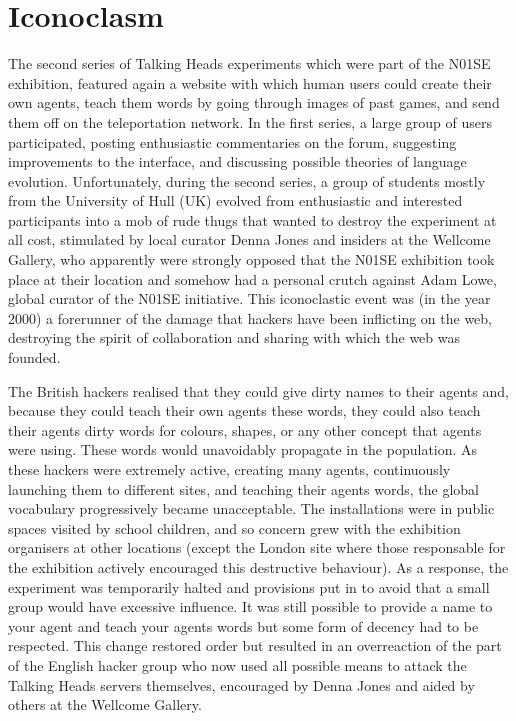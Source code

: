 \section{Iconoclasm} 

The second series of Talking Heads experiments which were part of the N01SE exhibition,
featured again a website with which human users could create their own 
agents, teach them words by going through images of past games, and send them off on the teleportation network.
In the first series, a
large group of users participated, posting enthusiastic commentaries on the forum, suggesting improvements 
to the interface, and discussing possible theories of language evolution. Unfortunately, during the second 
series, a group of students mostly from the University of Hull (UK) evolved from enthusiastic and interested 
participants into a mob of rude thugs that wanted to destroy the experiment at all cost, stimulated by 
local curator Denna Jones and insiders at the Wellcome Gallery, who apparently were strongly opposed 
that the N01SE exhibition took place 
at their location and somehow had a personal crutch against Adam Lowe, global curator of the N01SE initiative. 
This iconoclastic event was (in the year 2000) a forerunner of the damage that 
hackers have been inflicting on the web, destroying the spirit of collaboration and 
sharing with which the web was founded. 

The British hackers realised that they could give dirty names to their agents and, because they 
could teach their own agents these words, they could also teach their agents dirty words for colours, 
shapes, or any other concept that agents were using. These words would unavoidably propagate in the population. 
As these hackers were extremely active, creating many agents, continuously launching them to different sites, and teaching 
their agents words, the global vocabulary progressively became unacceptable. 
The installations were in public spaces visited by school children, and so concern grew with the exhibition organisers
at other locations (except the London site where those responsable for the exhibition
actively encouraged this destructive behaviour). 
As a response, the experiment was temporarily halted and provisions put in to avoid that a small group would have 
excessive influence. It was still possible to provide a name to your agent and teach your agents words but 
some form of decency had to be respected. This change restored order but resulted in an overreaction of the part of 
the English hacker group who now used all possible means to attack the Talking Heads servers themselves, 
encouraged by Denna Jones and aided by others at the Wellcome Gallery. 

